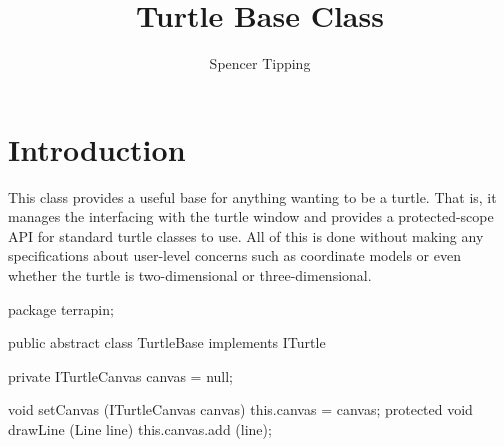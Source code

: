 \documentclass{article}
\begin{document}
  \title{Turtle Base Class}
  \author{Spencer Tipping}
  \maketitle

  \tableofcontents

  \section{Introduction}
    \label{sec:introduction}

    This class provides a useful base for anything wanting to be a turtle. That is, it manages the interfacing with the turtle window and provides a
    protected-scope API for standard turtle classes to use. All of this is done without making any specifications about user-level concerns such as coordinate
    models or even whether the turtle is two-dimensional or three-dimensional.

    \begin{javacode}
package terrapin;

public abstract class TurtleBase implements ITurtle {
  private ITurtleCanvas canvas = null;

  void           setCanvas (ITurtleCanvas canvas) {this.canvas = canvas;}
  protected void drawLine  (Line line)            {this.canvas.add (line);}
}
    \end{javacode}
\end{document}
